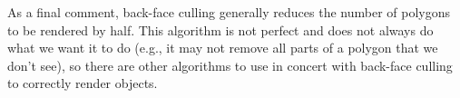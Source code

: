 As a final comment, back-face culling generally reduces the number of polygons to be rendered by half. This algorithm is not perfect and does not always do what we want it to do (e.g., it may not remove all parts of a polygon that we don't see), so there are other algorithms to use in concert with back-face culling to correctly render objects. 




